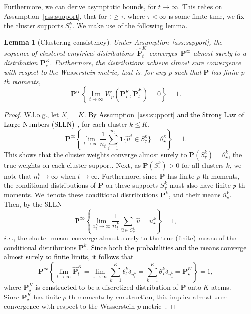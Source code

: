 \documentclass[12pt]{article}
\newcommand{\ie}{{\it i.e.}}
\newcommand{\prob}{{\mathbf P}}
\newcommand{\barp}{p}
\newtheorem{lemma}{Lemma}[section]  %
\newcommand{\RC}[1]{\textcolor{black}{#1}}
\newcommand{\RC}[1]{\textcolor{blue}{#1}}
\begin{document}
Furthermore, we can derive asymptotic bounds, for $t \to \infty$. 
This relies on Assumption~\ref{ass:support}, that for $t \geq \tau$, where $\tau < \infty$ is some finite time, we fix the cluster supports $S_t^k$. We make use of the following lemma. 
\begin{lemma}[Clustering consistency]
\label{lem:cluster_converge}
Under Assumption~\ref{ass:support}, the sequence of clustered empirical distributions~$\hat{\prob}^K_t$ converges~$\prob^\infty$-almost surely to a distribution $\prob^K_\star$. Furthermore, the distributions achieve almost sure convergence with respect to the Wasserstein metric, that is, for any $\barp$ such that $\prob$ has finite $\barp$-th moments,
    $$\prob^{\infty} \left \{ \lim_{t \to \infty} W_{\barp}(\prob^K_\star, \hat{\prob}^K_t) = 0\right\} = 1.$$
\end{lemma}
\begin{proof}
W.l.o.g., let $K_\tau = K$. 
\RC{By Assumption~\ref{ass:support} and the Strong Law of Large Numbers (SLLN)~\cite{slln}}, for each cluster $k \leq K$,
    $$\prob^\infty\left\{ \lim_{t\to\infty}\frac{1}{n_t} \sum_{i=1}^{n_t}\mathbf{1}\{\hat{u}^i \in S^k_\tau\} = \theta_\star^k\right\}=1. $$
     This shows that the cluster weights converge almost surely to $\prob(S^k_\tau) = \theta_\star^k$, the true weights on each cluster support. 
Next, as $\prob(S^k_\tau) >0$ for all clusters $k$, we note that $n^k_t \to \infty$ when $t \to \infty$. 
Furthermore, since $\prob$ has finite $\barp$-th moments, the conditional distributions of $\prob$ on these supports $S^k_\tau$ must also have finite $\barp$-th moments. We denote these conditional distributions $\prob^k$, and their means $\bar{u}^k_\star$. Then, by the SLLN,
$$\prob^\infty\left\{ \lim_{n_t^k\to\infty} \frac{1}{n_t^k} \sum_{\hat{u} \in C^k_\tau}\hat{u} = \bar{u}^k_\star\right\} = 1,$$
 \ie, the cluster \RC{means} converge almost surely to the true (finite) means of the conditional distributions $\prob^k$.
\RC{Since both the probabilities and the means converge almost surely to finite limits, it follows that}
 $$\prob^\infty\left\{ \lim_{t\to\infty} \hat{\prob}^K_t =\lim_{t\to\infty}\sum_{k=1}^K\theta^k_t\delta_{\bar{u}_t^k} = \sum_{k=1}^K\theta^k_\star\delta_{\bar{u}_\star^k} =\prob^K_\star\right\} = 1, $$
 where $\prob^K_\star$ is \RC{constructed to be} a discretized distribution of $\prob$ onto $K$ atoms. 
 Since $\prob^K_\star$ has finite $\barp$-th moments by construction, this implies almost sure convergence with respect to the Wasserstein-$\barp$ metric~\cite[Theorem 6.9]{optimal_transport_wass}.
\end{proof}
\end{document}
